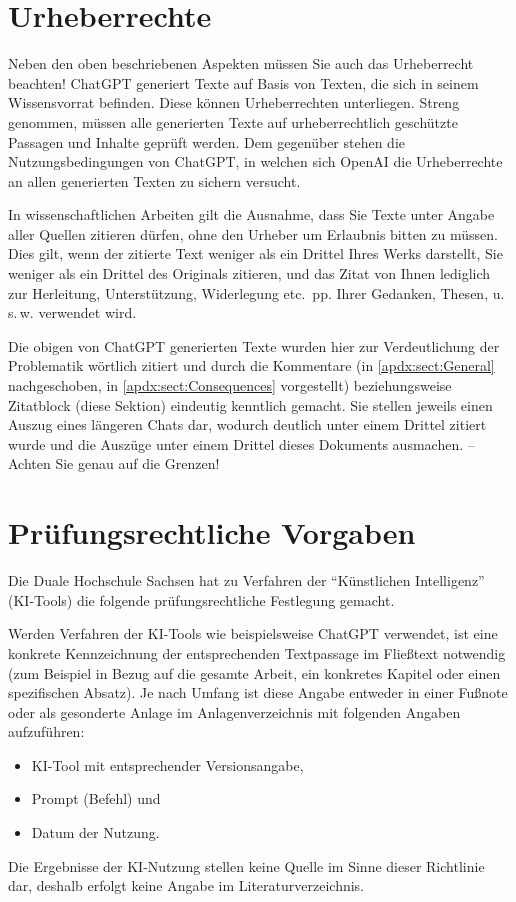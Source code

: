 \section{Urheberrechte}\label{apdx:sect:Copyright}
Neben den oben beschriebenen Aspekten müssen Sie auch das Urheberrecht beachten! Chat\-GPT generiert Texte auf Basis von Texten, die sich in seinem Wissensvorrat befinden. Diese können Urheberrechten unterliegen. Streng genommen, müssen alle generierten Texte auf urheberrechtlich geschützte Passagen und Inhalte geprüft werden. Dem gegenüber stehen die Nutzungsbedingungen von ChatGPT, in welchen sich OpenAI die Urheberrechte an allen generierten Texten zu sichern versucht.

In wissenschaftlichen Arbeiten gilt die Ausnahme, dass Sie Texte unter Angabe aller Quellen zitieren dürfen, ohne den Urheber um Erlaubnis bitten zu müssen. Dies gilt, wenn der zitierte Text weniger als ein Drittel Ihres Werks darstellt, Sie weniger als ein Drittel des Originals zitieren, und das Zitat von Ihnen lediglich zur Herleitung, Unterstützung, Widerlegung etc.~pp. Ihrer Gedanken, Thesen, u.\,s.\,w. verwendet wird.

Die obigen von ChatGPT generierten Texte wurden hier zur Verdeutlichung der Problematik wörtlich zitiert und durch die Kommentare (in \ref{apdx:sect:General} nachgeschoben, in \ref{apdx:sect:Consequences} vorgestellt) beziehungsweise Zitatblock (diese Sektion) eindeutig kenntlich gemacht. Sie stellen jeweils einen Auszug eines längeren Chats dar, wodurch deutlich unter einem Drittel zitiert wurde und die Auszüge unter einem Drittel dieses Dokuments ausmachen. --\,Achten Sie genau auf die Grenzen!

\section{Prüfungsrechtliche Vorgaben}\label{apdx:sect:Legal}
Die Duale Hochschule Sachsen hat zu Verfahren der \enquote{Künstlichen Intelligenz} (KI-Tools) die folgende prüfungsrechtliche Festlegung gemacht.

Werden Verfahren der KI-Tools wie beispielsweise ChatGPT verwendet, ist eine konkrete Kennzeichnung der entsprechenden Textpassage im Fließtext notwendig (zum Beispiel in Bezug auf die gesamte Arbeit, ein konkretes Kapitel oder einen spezifischen Absatz). Je nach Umfang ist diese Angabe entweder in einer Fußnote oder als gesonderte Anlage im Anlagenverzeichnis mit folgenden Angaben aufzuführen:
\begin{itemize}
    \item KI-Tool mit entsprechender Versionsangabe,
    \item Prompt (Befehl) und
    \item Datum der Nutzung.
\end{itemize}

Die Ergebnisse der KI-Nutzung stellen keine Quelle im Sinne dieser Richtlinie dar, deshalb erfolgt keine Angabe im Literaturverzeichnis.
